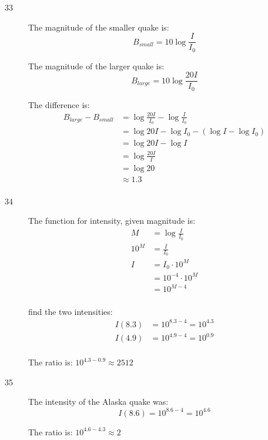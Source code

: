 \documentclass{exam}
\begin{document}
\begin{description}
      \item[33]
        The magnitude of the smaller quake is:
        \[
          B_{small} = 10 \log \frac{I}{I_0}
        \]

        The magnitude of the larger quake is:
        \[
          B_{large} = 10 \log \frac{20 I}{I_0}
        \]

        The difference is:
        \begin{align*}
          B_{large} - B_{small} & = \log \frac{20 I}{I_0} - \log \frac{I}{I_0} \\
                                & = \log 20I - \log I_0 - ( \log I - \log I_0) \\
                                & = \log 20I - \log I \\
                                & = \log \frac{20I}{I} \\
                                & = \log 20 \\
                                & \approx \boxed{1.3} \\
        \end{align*}

      \pagebreak

      \item[34]
        The function for intensity, given magnitude is:
        \begin{align*}
          M    & = \log \frac{I}{I_0} \\
          10^M & = \frac{I}{I_0} \\
          I     & = I_0 \cdot 10^M \\
                & = 10^{-4} \cdot 10^M \\
                & = 10^{M - 4} \\
        \end{align*}

        find the two intensities:
        \begin{align*}
          I(8.3) &= 10^{8.3 - 4} = 10^{4.3} \\
          I(4.9) &= 10^{4.9 - 4} = 10^{0.9} \\
        \end{align*}

        The ratio is: $10^{4.3 - 0.9} \approx \boxed{2512}$ 

      \item[35]
        The intensity of the Alaska quake was:
        \[
          I(8.6) = 10^{8.6 - 4} = 10^{4.6}
        \]

        The ratio is: $10^{4.6 - 4.3} \approx \boxed{2}$ 


\end{description}
\end{document}
